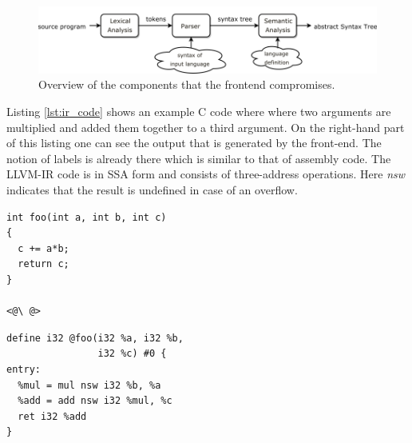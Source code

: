 \begin{figure}[t]
\centering
\includegraphics[width=\textwidth]{figures/frontend}%
\caption{Overview of the components that the frontend compromises.}
\label{fig:frontend}
\end{figure}

Listing \ref{lst:ir_code} shows an example C code where where two arguments are multiplied and added them together to a third argument. On the right-hand part of this listing one can see the output that is generated by the front-end. The notion of labels is already there which is similar to that of assembly code. The LLVM-IR code is in SSA form and consists of three-address operations. Here \emph{nsw} indicates that the result is undefined in case of an overflow.

\label{lst:ir_code}
\begin{center}
\hspace{2px}\begin{minipage}{.475\textwidth}
\lstset{style=customc}
\begin{lstlisting}[frame=tlrb]
int foo(int a, int b, int c)
{
  c += a*b;
  return c;
}

<@\ @>
\end{lstlisting}
\end{minipage}\hfill
\begin{minipage}{.475\textwidth}
\lstset{style=customasm}
\begin{lstlisting}[frame=tlrb]
define i32 @foo(i32 %a, i32 %b, 
                i32 %c) #0 {
entry:
  %mul = mul nsw i32 %b, %a
  %add = add nsw i32 %mul, %c
  ret i32 %add
}
\end{lstlisting}
\end{minipage}
\end{center}

